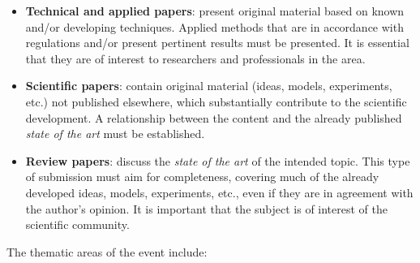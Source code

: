 \documentclass[12pt, a4paper, twoside, twocolumn]{article}
\begin{document}
\clearpage
\begin{itemize}[noitemsep,topsep=-1ex] \itemsep=7pt
	\item \textbf{Technical and applied papers}: present original material based on known and/or developing techniques. Applied methods that are in accordance with regulations and/or present pertinent results must be presented. It is essential that they are of interest to researchers and professionals in the area. 
	
	\item \textbf{Scientific papers}: contain original material (ideas, models, experiments, etc.) not published elsewhere, which substantially contribute to the scientific development. A relationship between the content and the already published \textit{state of the art} must be established.
	
    \item \textbf{Review papers}: discuss the \textit{state of the art} of the intended topic. This type of submission must aim for completeness, covering much of the already developed ideas, models, experiments, etc., even if they are in agreement with the author's opinion. It is important that the subject is of interest of the scientific community.
\end{itemize}

The thematic areas of the event include:
\end{document}
